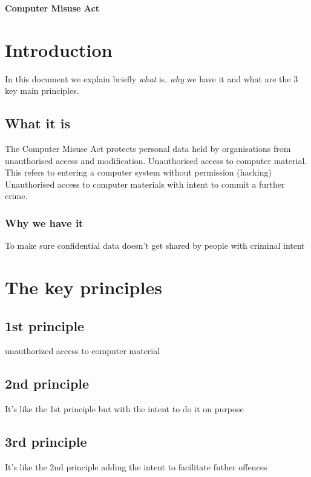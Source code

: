 \documentclass[a4paper,12pt]{article}
\begin{document}
\textbf{Computer Misuse Act}


\tableofcontents
\clearpage

 
\section{Introduction}

In this document we explain briefly \emph{what}  is, \emph{why} we have it and what are the 3 key main principles.

 
\subsection{What it is}
The Computer Misuse Act protects personal data held by organisations from unauthorised access and modification. Unauthorised access to computer material. This refers to entering a computer system without permission (hacking) Unauthorised access to computer materials with intent to commit a further crime.


 
\subsubsection{Why we have it}
To make sure confidential data doesn't get shared by people with criminal intent


 
\section{The key principles}


 
\subsection{1st principle}
unauthorized access to computer material

 
\subsection{2nd principle}
It's like the 1st principle but with the intent to do it on purpose

 
\subsection{3rd principle}
It's like the 2nd principle adding the intent to facilitate futher offences

\clearpage

\printindex
\end{document}
